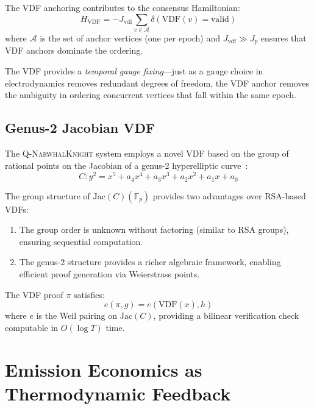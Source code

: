 \documentclass[12pt,a4paper,twocolumn]{article}
\newcommand{\qnk}{\textsc{Q-NarwhalKnight}}
\begin{document}
The VDF anchoring contributes to the consensus Hamiltonian:
\begin{equation}
H_{\mathrm{VDF}} = -J_{\mathrm{vdf}} \sum_{v \in \mathcal{A}} \delta(\text{VDF}(v) = \text{valid})
\end{equation}
where $\mathcal{A}$ is the set of anchor vertices (one per epoch) and $J_{\mathrm{vdf}} \gg J_p$ ensures that VDF anchors dominate the ordering.

The VDF provides a \emph{temporal gauge fixing}---just as a gauge choice in electrodynamics removes redundant degrees of freedom, the VDF anchor removes the ambiguity in ordering concurrent vertices that fall within the same epoch.

\subsection{Genus-2 Jacobian VDF}

The \qnk{} system employs a novel VDF based on the group of rational points on the Jacobian of a genus-2 hyperelliptic curve~\cite{genus2}:
\begin{equation}
C: y^2 = x^5 + a_4 x^4 + a_3 x^3 + a_2 x^2 + a_1 x + a_0
\end{equation}

The group structure of $\mathrm{Jac}(C)(\mathbb{F}_p)$ provides two advantages over RSA-based VDFs:
\begin{enumerate}[leftmargin=*]
\item The group order is unknown without factoring (similar to RSA groups), ensuring sequential computation.
\item The genus-2 structure provides a richer algebraic framework, enabling efficient proof generation via Weierstrass points.
\end{enumerate}

The VDF proof $\pi$ satisfies:
\begin{equation}
e(\pi, g) = e(\text{VDF}(x), h)
\end{equation}
where $e$ is the Weil pairing on $\mathrm{Jac}(C)$, providing a bilinear verification check computable in $O(\log T)$ time.

\section{Emission Economics as Thermodynamic Feedback}
\label{sec:emission}
\end{document}
